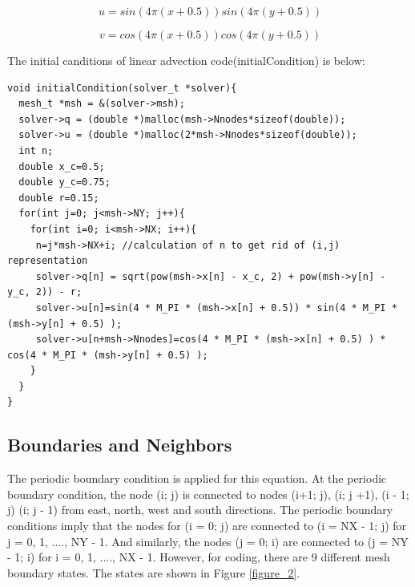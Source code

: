 \documentclass{article}
\begin{document}
\begin{equation} %
    \ u = sin(4\pi(x + 0.5))sin(4\pi(y + 0.5)) 
    \label{equation_7}
\end{equation}

\begin{equation} %
    \ v = cos(4\pi(x + 0.5))cos(4\pi(y + 0.5)) 
    \label{equation_8}
\end{equation}

The initial canditions of linear advection code(initialCondition) is below: 
\begin{verbatim}
void initialCondition(solver_t *solver){
  mesh_t *msh = &(solver->msh); 
  solver->q = (double *)malloc(msh->Nnodes*sizeof(double)); 
  solver->u = (double *)malloc(2*msh->Nnodes*sizeof(double));
  int n;
  double x_c=0.5;
  double y_c=0.75;
  double r=0.15;  
  for(int j=0; j<msh->NY; j++){
    for(int i=0; i<msh->NX; i++){    
     n=j*msh->NX+i; //calculation of n to get rid of (i,j) representation
     solver->q[n] = sqrt(pow(msh->x[n] - x_c, 2) + pow(msh->y[n] - y_c, 2)) - r;
     solver->u[n]=sin(4 * M_PI * (msh->x[n] + 0.5)) * sin(4 * M_PI * (msh->y[n] + 0.5) );
     solver->u[n+msh->Nnodes]=cos(4 * M_PI * (msh->x[n] + 0.5) ) * cos(4 * M_PI * (msh->y[n] + 0.5) );
    }
  }
}
\end{verbatim}

\clearpage
\subsection{Boundaries and Neighbors}

The periodic boundary condition is applied for this equation. At the periodic boundary condition, the node (i; j) is connected to nodes (i+1; j), (i; j +1), (i - 1; j) (i; j - 1) from east, north, west and south directions. The periodic boundary conditions imply that the nodes for (i = 0; j) are connected to (i = NX - 1; j) for j = 0, 1, ...., NY - 1. And similarly, the nodes (j = 0; i) are connected to (j = NY - 1; i) for i = 0, 1, ...., NX - 1. However, for coding, there are 9 different mesh boundary states. The states are shown in Figure \ref{figure_2}. 
\end{document}
